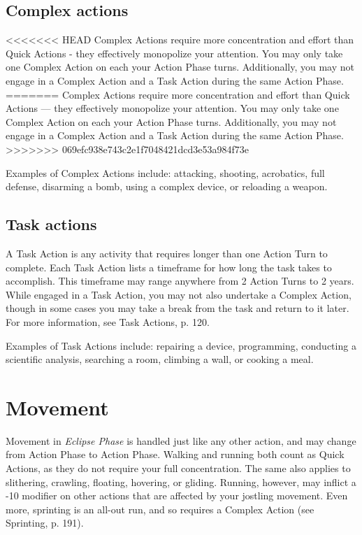 \subsection{Complex actions} \label{sec:combat-complex-actions} 

<<<<<<< HEAD Complex Actions require more concentration and effort than Quick Actions - they effectively monopolize your attention. You may only take one Complex Action on each your Action Phase turns. Additionally, you may not engage in a Complex Action and a Task Action during the same Action Phase. ======= Complex Actions require more concentration and effort than Quick Actions --- they effectively monopolize your attention. You may only take one Complex Action on each your Action Phase turns. Additionally, you may not engage in a Complex Action and a Task Action during the same Action Phase. >>>>>>> 069efc938e743c2e1f7048421dcd3e53a984f73e 

Examples of Complex Actions include: attacking, shooting, acrobatics, full defense, disarming a bomb, using a complex device, or reloading a weapon. 



\subsection{Task actions} \label{sec:combat-task-actions} 

A Task Action is any activity that requires longer than one Action Turn to complete. Each Task Action lists a timeframe for how long the task takes to accomplish. This timeframe may range anywhere from 2 Action Turns to 2 years. While engaged in a Task Action, you may not also undertake a Complex Action, though in some cases you may take a break from the task and return to it later. For more information, see Task Actions, p. 120. 

Examples of Task Actions include: repairing a device, programming, conducting a scientific analysis, searching a room, climbing a wall, or cooking a meal. 



\section{Movement} \label{sec:combat-movement} 

Movement in \emph{Eclipse Phase} is handled just like any other action, and may change from Action Phase to Action Phase. Walking and running both count as Quick Actions, as they do not require your full concentration. The same also applies to slithering, crawling, floating, hovering, or gliding. Running, however, may inflict a -10 modifier on other actions that are affected by your jostling movement. Even more, sprinting is an all-out run, and so requires a Complex Action (see Sprinting, p. 191). 

